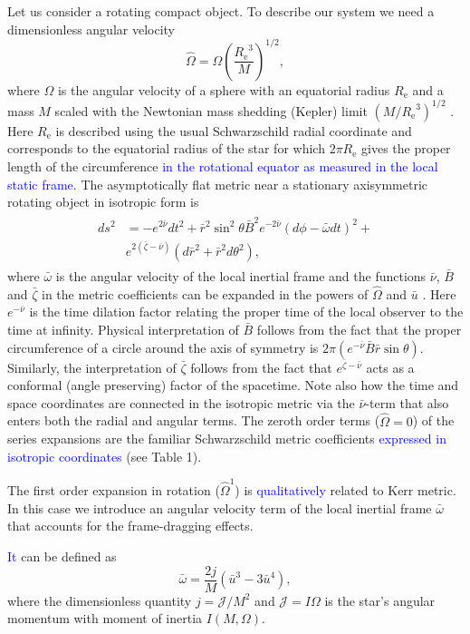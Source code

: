 \documentclass{aa}
\newcommand{\be}{\begin{equation}}
\newcommand{\ee}{\end{equation}}
\newcommand{\refe}[1]{\textcolor{blue}{{#1}}}
\newcommand{\refedel}[1]{}
\newcommand{\Req}{\ensuremath{R_{\mathrm{e}}}}
\newcommand{\sch}{Schwarzschild }
\newcommand{\rb}{\ensuremath{\bar{r}}}
\newcommand{\ub}{\ensuremath{\bar{u}}}
\newcommand{\wb}{\ensuremath{\bar{\omega}}}
\newcommand{\Ob}{\ensuremath{\hat{\Omega}}}
\newcommand{\nub}{\ensuremath{\bar{\nu}}}
\newcommand{\zetab}{\ensuremath{\bar{\zeta}}}
\newcommand{\Bb}{\ensuremath{\bar{B}}}
\begin{document}
Let us consider a rotating compact object.
\refedel{In addition to the dimensionless compactness parameter $u(r)$ (or $\ub(\rb)$),}To describe our system we need a dimensionless angular velocity
\be
\Ob = \Omega \left( \frac{\Req^3}{M} \right)^{1/2},
\ee
where $\Omega$ is the angular velocity of a sphere with an equatorial radius $\Req$ and a mass $M$ scaled with the Newtonian mass shedding (Kepler) limit $(M/\Req^3)^{1/2}$ \citep[see][p.29]{rcs}.  
Here $\Req$ is described using the usual \sch radial coordinate and corresponds to the equatorial radius of the star for which $2\pi\Req$ gives the proper length of the circumference \refe{in the rotational equator as measured in the local static frame.}
The asymptotically flat metric near a stationary axisymmetric rotating object in isotropic form is \citep{BW71} 
\begin{align}\begin{split} \label{eq:BWmetric}
ds^2 & = -e^{2\nub} dt^2 +
     \rb^2 \sin^2\theta \Bb^2 e^{-2\nub}(d\phi - \wb dt)^2 + \\
     & e^{2(\zetab-\nub)}(d\rb^2 + \rb^2d\theta^2),
\end{split}\end{align}
where $\wb$ is the angular velocity of the local inertial frame and the functions $\nub$, $\Bb$ and $\zetab$ in the metric coefficients can be expanded in the powers of $\Ob$ and $\ub$ \citep{BI76}.
Here $e^{-\nub}$ is the time dilation factor relating the proper time of the local observer to the time at infinity.
Physical interpretation of $\Bb$ follows from the fact that the proper circumference of a circle around the axis of symmetry is $2\pi(e^{-\nub} \Bb \rb \sin\theta)$.
Similarly, the interpretation of $\zetab$ follows from the fact that $e^{\zetab - \nub}$ acts as a conformal (angle preserving) factor of the spacetime. %
Note also how the time and space coordinates are connected in the isotropic metric via the $\nub$-term that also enters both the radial and angular terms.
The zeroth order terms ($\Ob = 0$) of the series expansions are the familiar \sch metric coefficients \refe{expressed in isotropic coordinates} (see Table 1).

The first order expansion in rotation ($\Ob^1$) is \refedel{formally}\refe{qualitatively} related to Kerr metric.
In this case we introduce an angular velocity term of the local inertial frame $\wb$ that accounts for the frame-dragging effects. 
\refedel{Up to \refe{second} order,} 
\refe{It} can be defined as
\be\label{eq:wbar}
\wb = \frac{2 j}{M} (\ub^3 - 3\ub^4),
\ee
where the dimensionless quantity $j=\mathcal{J}/M^2$ and $\mathcal{J} = I \Omega$ is the star's angular momentum with moment of inertia $I(M,\Omega)$.
\end{document}
